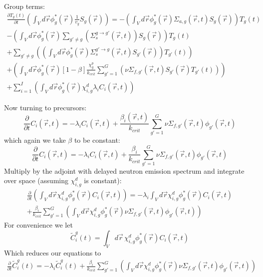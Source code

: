 \documentclass[12pt]{report}
\begin{document}
	Group terms:
		\begin{eqnarray} 
		\frac{\partial T_g(t)}{\partial t} \left( \int_{V} d\vec{r} \phi_g^*(\vec{r}) \frac{1}{v_g}  S_g(\vec{r}) \right) = - \left( \int_{V} d\vec{r} \phi_g^*(\vec{r}) \Sigma_{a,g}(\vec{r},t)  S_g(\vec{r}) \right) T_g(t) \nonumber \\
		- \left( \int_{V} d\vec{r} \phi_g^*(\vec{r}) \sum_{g'\neq g} \left( \Sigma_{s}^{g\rightarrow g'}(\vec{r},t) \right)  S_g(\vec{r}) \right) T_g(t) \nonumber \\
		+ \sum_{g'\neq g} \left( \left( \int_{V}  d\vec{r} \phi_g^*(\vec{r})  \Sigma_{s}^{g'\rightarrow g} (\vec{r},t)  S_{g'}(\vec{r}) \right) T_{g'}(t) 
		\right) \nonumber \\
		+ \left( \int_{V} d\vec{r} \phi_g^*(\vec{r}) \left[ 1- \beta \right] \frac{\chi_g^p}{k_{crit}} \sum_{g'=1}^{G} \left( \nu \Sigma_{f,g'}(\vec{r},t) S_{g'}(\vec{r}) T_{g'}(t) \right) \right) \nonumber \\ +
		\sum_{i=1}^{I} \left( \int_{V} d\vec{r} \phi_g^*(\vec{r})  \chi_{i,g}^d \lambda_i C_i(\vec{r},t) \right)
		\end{eqnarray}
	
	Now turning to precursors:
	\begin{equation}
	\frac{\partial}{\partial t} C_i(\vec{r},t) = -\lambda_i C_i(\vec{r},t) + \frac{\beta_i(\vec{r},t)}{k_{crit}} \sum_{g'=1}^{G} \nu \Sigma_{f,g'}(\vec{r},t) \phi_{g'}(\vec{r},t)
	\end{equation}
	which again we take $\beta$ to be constant:
	\begin{equation}
	\frac{\partial}{\partial t} C_i(\vec{r},t) = -\lambda_i C_i(\vec{r},t) + \frac{\beta_i}{k_{crit}} \sum_{g'=1}^{G} \nu \Sigma_{f,g'}(\vec{r},t) \phi_{g'}(\vec{r},t)
	\end{equation}
	Multiply by the adjoint with delayed neutron emission spectrum and integrate over space (assuming $\chi^d_{i,g}$ is constant):
	\begin{eqnarray}
	\frac{\partial}{\partial t} \left( \int_{V} d\vec{r} \chi^d_{i,g} \phi_g^*(\vec{r}) C_i(\vec{r},t) \right)= -\lambda_i \int_{V} d\vec{r} \chi^d_{i,g} \phi_g^*(\vec{r}) C_i(\vec{r},t) \nonumber \\
	 + \frac{\beta_i}{k_{crit}} \sum_{g'=1}^{G}\left( \int_{V} d\vec{r} \chi^d_{i,g} \phi_g^*(\vec{r}) \nu \Sigma_{f,g'}(\vec{r},t) \phi_{g'}(\vec{r},t) \right)
	\end{eqnarray}
	For convenience we let 
	\begin{equation}
	\tilde{C}_i^g(t) = \int_{V} d\vec{r} \, \chi^d_{i,g} \phi_g^*(\vec{r}) C_i(\vec{r},t) 
	\end{equation}
	Which reduces our equations to
		\begin{eqnarray}
		\frac{\partial}{\partial t} \tilde{C}_i^g(t) = -\lambda_i \tilde{C}_i^g(t) + \frac{\beta_i}{k_{crit}} \sum_{g'=1}^{G}\left( \int_{V} d\vec{r} \chi^d_{i,g} \phi_g^*(\vec{r}) \nu \Sigma_{f,g'}(\vec{r},t) \phi_{g'}(\vec{r},t) \right)
		\end{eqnarray}
	
\end{document}
